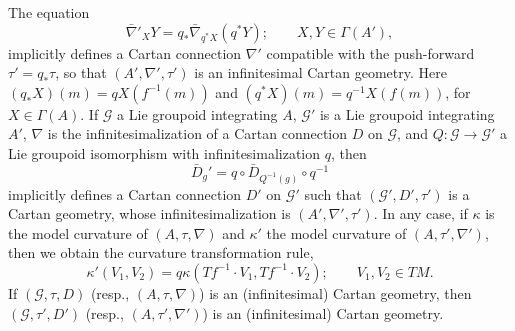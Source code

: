\documentclass[leqno,12pt]{amsart} %
\begin{document}
\begin{proposition}
  The equation
  \begin{equation}
    \label{tarragon1}
    \bar\nabla'_XY = q_*\bar\nabla_{q^*X} (q^*Y); \qquad X, Y \in \Gamma(A'),
  \end{equation}
  implicitly defines a Cartan connection $\nabla' $ compatible with the push-forward
  $\tau'=q_*\tau $, so that $(A', \nabla', \tau')$ is an infinitesimal Cartan
  geometry. Here $(q_*X)(m)=qX(f^{-1}(m))$ and $(q^*X)(m) = q^{-1}X(f(m))$, for
  $X \in \Gamma(A)$. If ${\mathcal G}$ a Lie groupoid integrating $A$, ${\mathcal G}'$ is
  a Lie groupoid integrating $A'$, $\nabla $ is the infinitesimalization of a Cartan
  connection $D$ on ${\mathcal G} $, and
  $Q \colon {\mathcal G} \rightarrow {\mathcal G}' $ a Lie groupoid isomorphism with
  infinitesimalization $q$, then
  \begin{equation}
    \label{tarragon2}
    \bar D_g' = q \circ \bar D_{Q^{-1}(g)} \circ q^{-1}
  \end{equation}
  implicitly defines a Cartan connection $D'$ on ${\mathcal G}' $ such that
  $({\mathcal G}', D', \tau')$ is a Cartan geometry, whose infinitesimalization is
  $(A', \nabla', \tau')$. In any case, if $\kappa$ is the model curvature of
  $(A, \tau, \nabla)$ and $\kappa'$ the model curvature of $(A, \tau', \nabla')$, then we
  obtain the {\df curvature transformation rule},
  \begin{equation}
    \label{tarragon5}
    \kappa'(V_1, V_2) = q \kappa (Tf^{-1} \cdot V_1, Tf^{-1}\cdot V_2); \qquad V_1, V_2 \in TM.
  \end{equation}
  If $({\mathcal G}, \tau, D)$ (resp., $(A, \tau, \nabla)$) is an (infinitesimal)
  Cartan geometry, then $({\mathcal G}, \tau', D')$ (resp., $(A, \tau', \nabla')$) is an
  (infinitesimal) Cartan geometry.
\end{proposition}
\end{document}

